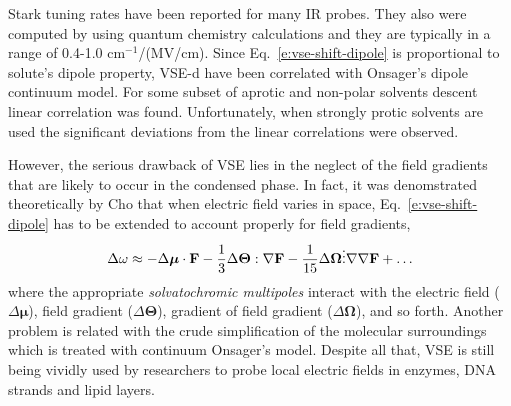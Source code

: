 \documentclass[a4paper,titlepage,twoside,fleqn,12pt]{book}
\newcommand{\BM}[1]{\bm{#1}}
\begin{document}
\begin{refsection}
\begin{equation}
\end{equation}
%
Stark tuning rates have been reported for many IR probes.\citep{Suydam.Boxer.Biochem.2003,Levinson.Fried.Boxer.JPCB.2012}
They also were computed by using quantum chemistry calculations\citep{Dalosto.Vanderkooi.Sharp.JPCB.2004,
Andrews.Boxer.JPCA.2002,Andrews.Boxer.JPCA.2000}
and they are typically in a range of 0.4-1.0 cm$^{-1}$/(MV/cm). 
Since Eq.~\eqref{e:vse-shift-dipole} is proportional to solute's
dipole property, VSE-d have been correlated with Onsager's dipole
continuum model. For some subset of aprotic and non-polar
solvents descent linear correlation was found.\citep{Levinson.Fried.Boxer.JPCB.2012} 
Unfortunately,
when strongly protic solvents are used the significant deviations
from the linear correlations were observed.\citep{Fafarman.Sigala.Herschlag.Boxer.JACS.2010,Bagchi.Fried.Boxer.JACS.2012}

However, the serious drawback of VSE lies in the neglect of the field gradients that are 
likely to occur in the condensed phase. In fact, it was denomstrated theoretically
by Cho\citep{Cho.JCP.2009,Lee.Choi.Cho.JCP.2012} 
that when electric field varies in space, Eq.~\eqref{e:vse-shift-dipole}
has to be extended to account properly for field gradients,
%
\begin{equation} \label{e:vse-shift-multipoles}
 \Delta \omega 
\approx 
             - \Delta {\BM \mu}    \cdot               {\bf F} 
- \frac{1}{3}  \Delta {\BM \Theta} :      \nabla       {\bf F}
- \frac{1}{15} \Delta {\BM \Omega} \vdots \nabla\nabla {\bf F}
+ \ldots
\end{equation}
%
where the appropriate \emph{solvatochromic multipoles}
interact with the electric field ($\Delta {\BM \mu}$), 
field gradient ($\Delta {\BM \Theta}$), gradient of field gradient ($\Delta {\BM \Omega}$),
and so forth.
Another problem is related with the crude simplification of the 
molecular surroundings which is treated with continuum Onsager's model.
Despite all that, VSE is still being vividly
used by researchers to probe local electric fields in enzymes, DNA strands and 
lipid layers. 


\end{refsection}
\end{document}
